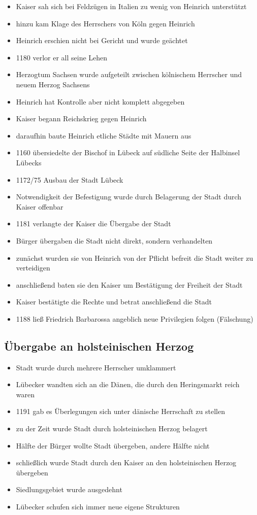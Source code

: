 \documentclass[10pt,a4paper,oneside,ngerman,numbers=noenddot]{scrartcl}
\newenvironment{myitemize}{\begin{itemize}\itemsep -2pt}{\end{itemize}} %
\begin{document}
\begin{myitemize}
    \item Kaiser sah sich bei Feldzügen in Italien zu wenig von Heinrich unterstützt
    \item hinzu kam Klage des Herrschers von Köln gegen Heinrich
    \item Heinrich erschien nicht bei Gericht und wurde geächtet
    \item 1180 verlor er all seine Lehen
    \item Herzogtum Sachsen wurde aufgeteilt zwischen kölnischem Herrscher und neuem Herzog Sachsens
    \item Heinrich hat Kontrolle aber nicht komplett abgegeben
    \item Kaiser begann Reichskrieg gegen Heinrich
    \item daraufhin baute Heinrich etliche Städte mit Mauern aus
    \item 1160 übersiedelte der Bischof in Lübeck auf südliche Seite der Halbinsel Lübecks
    \item 1172/75 Ausbau der Stadt Lübeck
    \item Notwendigkeit der Befestigung wurde durch Belagerung der Stadt durch Kaiser offenbar
    \item 1181 verlangte der Kaiser die Übergabe der Stadt
    \item Bürger übergaben die Stadt nicht direkt, sondern verhandelten
    \item zunächst wurden sie von Heinrich von der Pflicht befreit die Stadt weiter zu verteidigen
    \item anschließend baten sie den Kaiser um Bestätigung der Freiheit der Stadt
    \item Kaiser bestätigte die Rechte und betrat anschließend die Stadt
    \item 1188 ließ Friedrich Barbarossa angeblich neue Privilegien folgen (Fälschung)
\end{myitemize}

\subsection*{Übergabe an holsteinischen Herzog}
\begin{myitemize}
    \item Stadt wurde durch mehrere Herrscher umklammert
    \item Lübecker wandten sich an die Dänen, die durch den Heringsmarkt reich waren
    \item 1191 gab es Überlegungen sich unter dänische Herrschaft zu stellen
    \item zu der Zeit wurde Stadt durch holsteinischen Herzog belagert
    \item Hälfte der Bürger wollte Stadt übergeben, andere Hälfte nicht
    \item schließlich wurde Stadt durch den Kaiser an den holsteinischen Herzog übergeben
    \item Siedlungsgebiet wurde ausgedehnt
    \item Lübecker schufen sich immer neue eigene Strukturen
\end{myitemize}
\end{document}
